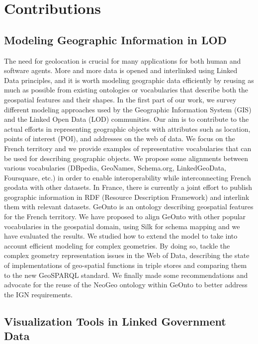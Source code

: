 \section{Contributions}
\label{sec:contributions}

\subsection{Modeling Geographic Information in LOD} \label{model}
The need for geolocation is crucial for many applications for both human and software agents. More and more data is opened and interlinked using Linked Data principles, and it is worth modeling geographic data efficiently by reusing as much as possible from existing ontologies or vocabularies that describe both the geospatial features and their shapes. In the first part of our work, we survey different modeling approaches used by the Geographic Information System (GIS) and the Linked Open Data (LOD) communities. Our aim is to contribute to the actual efforts in representing geographic objects with attributes such as location, points of interest (POI), and addresses on the web of data. We focus on the French territory and we provide examples of representative vocabularies that can be used for describing geographic objects. We propose some alignments between various vocabularies (DBpedia, GeoNames, Schema.org, LinkedGeoData, Foursquare, etc.) in order to enable interoperability while interconnecting French geodata with other datasets. In France, there is  currently a joint effort to publish geographic information in RDF (Resource Description Framework) and interlink them with relevant datasets. GeOnto is an ontology describing geospatial features for the French territory. We have proposed to align GeOnto with other popular vocabularies in the geospatial domain, using Silk for schema mapping and we have evaluated the results. We studied how to extend the model to take into account efficient modeling for complex geometries. By doing so, tackle the complex geometry representation issues in the Web of Data, describing the state of implementations of geo-spatial functions in triple stores and comparing them to the new GeoSPARQL standard.  We finally made some recommendations and advocate for the reuse of the NeoGeo ontology within GeOnto to better address the IGN requirements.

\subsection{Visualization Tools in Linked Government Data} \label{visu}

